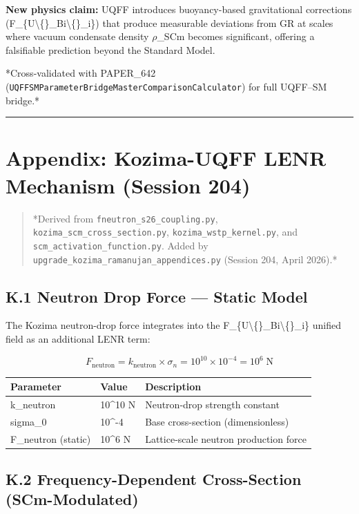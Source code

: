 \documentclass[11pt]{article}
\begin{document}
\textbf{New physics claim:} UQFF introduces buoyancy-based gravitational corrections (F\_\{U\textbackslash\{\}\_Bi\textbackslash\{\}\_i\}) that produce measurable deviations from GR at scales where vacuum condensate density $\rho$\_SCm becomes significant, offering a falsifiable prediction beyond the Standard Model.

*Cross-validated with PAPER\_642 (\verb|UQFFSMParameterBridgeMasterComparisonCalculator|) for full UQFF--SM bridge.*

\noindent\rule{\textwidth}{0.4pt}

\section*{Appendix: Kozima-UQFF LENR Mechanism (Session 204)}

\begin{quote}
*Derived from \verb|fneutron_s26_coupling.py|, \verb|kozima_scm_cross_section.py|,
\verb|kozima_wstp_kernel.py|, and \verb|scm_activation_function.py|. Added by
\verb|upgrade_kozima_ramanujan_appendices.py| (Session 204, April 2026).*
\end{quote}

\subsection*{K.1 Neutron Drop Force --- Static Model}

The Kozima neutron-drop force integrates into the F\_\{U\textbackslash\{\}\_Bi\textbackslash\{\}\_i\} unified field as an additional LENR term:

$$F_{\mathrm{neutron}} = k_{\mathrm{neutron}} \times \sigma_n = 10^{10} \times 10^{-4} = 10^6 \;\text{N}$$

\begin{center}
\begin{longtable}{lll}
\toprule
Parameter & Value & Description \tabularnewline
\midrule
\endhead
k\_neutron & 10\textasciicircum{}10 N & Neutron-drop strength constant \tabularnewline
sigma\_0 & 10\textasciicircum{}-4 & Base cross-section (dimensionless) \tabularnewline
F\_neutron (static) & 10\textasciicircum{}6 N & Lattice-scale neutron production force \tabularnewline
\bottomrule
\end{longtable}
\end{center}

\subsection*{K.2 Frequency-Dependent Cross-Section (SCm-Modulated)}
\end{document}
